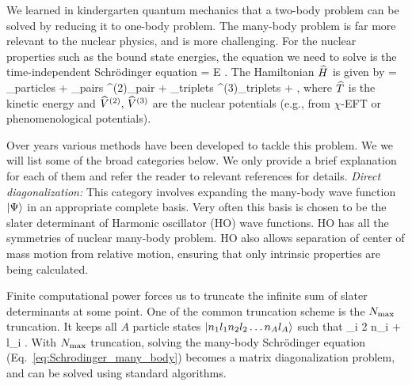 
	We learned in kindergarten quantum mechanics that a two-body problem
	can be solved by reducing it to one-body problem.  The many-body
	problem is far more relevant to the nuclear physics, and is more
	challenging.
	For the nuclear properties such as the bound state energies, the
	equation we need to solve is the time-independent Schr\"{o}dinger equation
	\beq
	 \ket{\Psi} = E \ket{\Psi} \;.
	\label{eq:Schrodinger_many_body}
	\eeq
	The Hamiltonian $\widehat{H}$ is given by
	\beq
	 = \sum_{\rm particles}  + \sum_{\rm pairs}
	^{(2)}_{\rm pair} + \sum_{\rm triplets}
	^{(3)}_{\rm triplets} + \cdots \;,
	\eeq
	where $\widehat{T}$ is the kinetic energy and $\widehat{V}^{(2)}, \, \widehat{V}^{(3)}$ are
	the nuclear potentials (e.g., from $\chi$-EFT or phenomenological potentials).

	Over years various methods have been developed to tackle
  this problem.  We we will list some of the broad categories below.
	We only provide
  a brief explanation for each of them and refer the reader to relevant
  references for details.
	\bi
	\li
	\emph{Direct diagonalization:}
	This category involves expanding the many-body wave function ${|\Psi\rangle}$ in
	an appropriate complete basis.  Very often this basis is chosen to be the
	slater determinant of Harmonic oscillator (HO) wave functions.
	HO has all the symmetries of nuclear many-body problem.  HO also allows
	separation of center of mass motion from relative motion, ensuring that only
	intrinsic properties are being calculated.

	Finite computational power forces us to truncate the infinite sum of
	slater determinants at some point.  One of the common truncation scheme is
	the ${N_{\mathrm{max}}}$ truncation.  It keeps all $A$ particle states
	${|n_1 l_1 n_2 l_2 \ldots n_A l_A\rangle}$ such that
	\beq
	\sum_i 2 n_i + l_i \leq \Nmax \;.
	\eeq
	With ${N_{\mathrm{max}}}$ truncation, solving the many-body Schr\"{o}dinger equation
	(Eq.~\eqref{eq:Schrodinger_many_body}) becomes a matrix diagonalization
	problem, and can be solved using standard algorithms.

